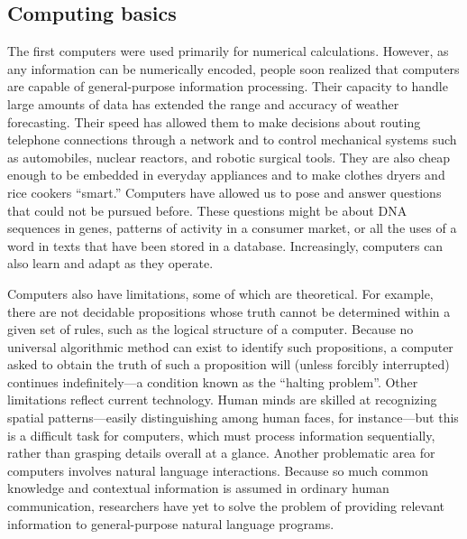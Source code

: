 \documentclass[11pt,a4paper,twoside]{article}
\begin{document}
\subsection{Computing basics}
The first computers were used primarily for numerical calculations. However, as any information can be numerically encoded, people soon realized that computers are capable of general-purpose information processing. Their capacity to handle large amounts of data has extended the range and accuracy of weather forecasting. Their speed has allowed them to make decisions about routing telephone connections through a network and to control mechanical systems such as automobiles, nuclear reactors, and robotic surgical tools. They are also cheap enough to be embedded in everyday appliances and to make clothes dryers and rice cookers “smart.” Computers have allowed us to pose and answer questions that could not be pursued before. These questions might be about DNA sequences in genes, patterns of activity in a consumer market, or all the uses of a word in texts that have been stored in a database. Increasingly, computers can also learn and adapt as they operate.\par
Computers also have limitations, some of which are theoretical. For example, there are not decidable propositions whose truth cannot be determined within a given set of rules, such as the logical structure of a computer. Because no universal algorithmic method can exist to identify such propositions, a computer asked to obtain the truth of such a proposition will (unless forcibly interrupted) continues indefinitely—a condition known as the “halting problem”. Other limitations reflect current technology. Human minds are skilled at recognizing spatial patterns—easily distinguishing among human faces, for instance—but this is a difficult task for computers, which must process information sequentially, rather than grasping details overall at a glance. Another problematic area for computers involves natural language interactions. Because so much common knowledge and contextual information is assumed in ordinary human communication, researchers have yet to solve the problem of providing relevant information to general-purpose natural language programs.
\end{document}
